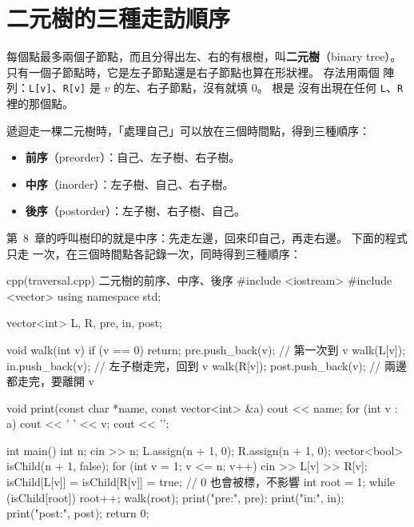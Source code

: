 \section{二元樹的三種走訪順序}
\label{sec:tree-binary}

每個點最多兩個子節點，而且分得出左、右的有根樹，叫\textbf{二元樹}（binary
tree）。 只有一個子節點時，它是左子節點還是右子節點也算在形狀裡。 存法用兩個
陣列：\texttt{L[v]}、\texttt{R[v]} 是 $v$ 的左、右子節點，沒有就填 $0$。 根是
沒有出現在任何 \texttt{L}、\texttt{R} 裡的那個點。

遞迴走一棵二元樹時，「處理自己」可以放在三個時間點，得到三種順序：

\begin{itemize}
\item \textbf{前序}（preorder）：自己、左子樹、右子樹。
\item \textbf{中序}（inorder）：左子樹、自己、右子樹。
\item \textbf{後序}（postorder）：左子樹、右子樹、自己。
\end{itemize}

第~8~章的呼叫樹印的就是中序：先走左邊，回來印自己，再走右邊。 下面的程式只走
一次，在三個時間點各記錄一次，同時得到三種順序：

\begin{example}[label=ex:traversal]{cpp}{(traversal.cpp) 二元樹的前序、中序、後序}
#include <iostream>
#include <vector>
using namespace std;

vector<int> L, R, pre, in, post;

void walk(int v) {
    if (v == 0) {
        return;
    }
    pre.push_back(v);       // 第一次到 v
    walk(L[v]);
    in.push_back(v);        // 左子樹走完，回到 v
    walk(R[v]);
    post.push_back(v);      // 兩邊都走完，要離開 v
}

void print(const char *name, const vector<int> &a) {
    cout << name;
    for (int v : a) {
        cout << ' ' << v;
    }
    cout << '\n';
}

int main() {
    int n;
    cin >> n;
    L.assign(n + 1, 0);
    R.assign(n + 1, 0);
    vector<bool> isChild(n + 1, false);
    for (int v = 1; v <= n; v++) {
        cin >> L[v] >> R[v];
        isChild[L[v]] = isChild[R[v]] = true;   // 0 也會被標，不影響
    }
    int root = 1;
    while (isChild[root]) {
        root++;
    }
    walk(root);
    print("pre:", pre);
    print("in:", in);
    print("post:", post);
    return 0;
}
\end{example}


